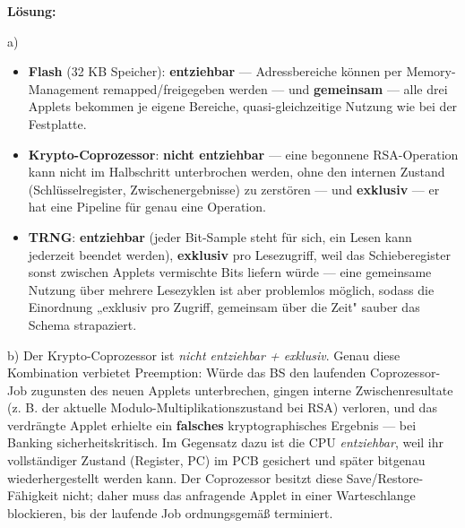 \documentclass[11pt, a4paper]{article}
\begin{document}
\textbf{Lösung:}


a)

\begin{itemize}
  \item \textbf{Flash} (32 KB Speicher): \textbf{entziehbar} — Adressbereiche können per Memory-Management remapped/freigegeben werden — und \textbf{gemeinsam} — alle drei Applets bekommen je eigene Bereiche, quasi-gleichzeitige Nutzung wie bei der Festplatte.
  \item \textbf{Krypto-Coprozessor}: \textbf{nicht entziehbar} — eine begonnene RSA-Operation kann nicht im Halbschritt unterbrochen werden, ohne den internen Zustand (Schlüsselregister, Zwischenergebnisse) zu zerstören — und \textbf{exklusiv} — er hat eine Pipeline für genau eine Operation.
  \item \textbf{TRNG}: \textbf{entziehbar} (jeder Bit-Sample steht für sich, ein Lesen kann jederzeit beendet werden), \textbf{exklusiv} pro Lesezugriff, weil das Schieberegister sonst zwischen Applets vermischte Bits liefern würde — eine gemeinsame Nutzung über mehrere Lesezyklen ist aber problemlos möglich, sodass die Einordnung „exklusiv pro Zugriff, gemeinsam über die Zeit" sauber das Schema strapaziert.
\end{itemize}

b) Der Krypto-Coprozessor ist \textit{nicht entziehbar + exklusiv}. Genau diese Kombination verbietet Preemption: Würde das BS den laufenden Coprozessor-Job zugunsten des neuen Applets unterbrechen, gingen interne Zwischenresultate (z. B. der aktuelle Modulo-Multiplikationszustand bei RSA) verloren, und das verdrängte Applet erhielte ein \textbf{falsches} kryptographisches Ergebnis — bei Banking sicherheitskritisch. Im Gegensatz dazu ist die CPU \textit{entziehbar}, weil ihr vollständiger Zustand (Register, PC) im PCB gesichert und später bitgenau wiederhergestellt werden kann. Der Coprozessor besitzt diese Save/Restore-Fähigkeit nicht; daher muss das anfragende Applet in einer Warteschlange blockieren, bis der laufende Job ordnungsgemäß terminiert.





\end{document}
